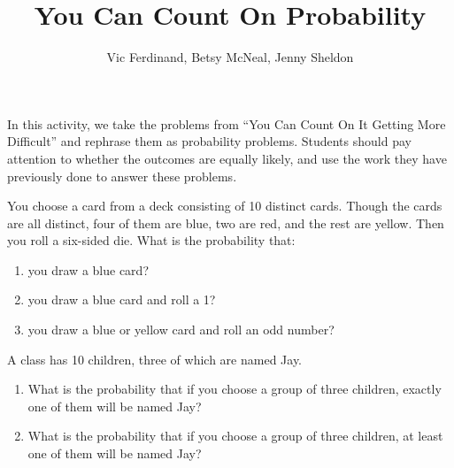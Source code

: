 \documentclass{ximera}
\title{You Can Count On Probability}
\author{Vic Ferdinand, Betsy McNeal, Jenny Sheldon}
\begin{document}
\begin{abstract}
\end{abstract}
\maketitle

\begin{instructorIntro}
In this activity, we take the problems from ``You Can Count On It Getting More Difficult'' and rephrase them as probability problems.  Students should pay attention to whether the outcomes are equally likely, and use the work they have previously done to answer these problems.
\end{instructorIntro}


\begin{problem}
You choose a card from a deck consisting of 10 distinct cards.  Though the cards are all distinct, four of them are blue, two are red, and the rest are yellow.  Then you roll a six-sided die.  What is the probability that:
\begin{enumerate}
\item you draw a blue card?
\item you draw a blue card and roll a 1?
\item you draw a blue or yellow card and roll an odd number?
\end{enumerate}
\end{problem}

\begin{problem}
A class has 10 children, three of which are named Jay.  
\begin{enumerate}
\item What is the probability that if you choose a group of three children, exactly one of them will be named Jay?
\item What is the probability that if you choose a group of three children, at least one of them will be named Jay?
\end{enumerate}
\end{problem}
\end{document}
